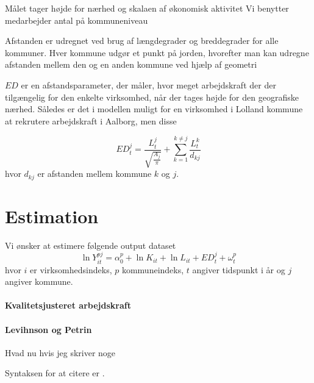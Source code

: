 \documentclass[a4paper, 12pt]{article}
\begin{document}
Målet tager højde for nærhed og skalaen af økonomisk aktivitet 
Vi benytter medarbejder antal på kommuneniveau

Afstanden er udregnet ved brug af længdegrader og breddegrader for alle kommuner. Hver kommune udgør et punkt på jorden, hvorefter man kan udregne afstanden mellem den og en anden kommune ved hjælp af geometri  

$ED$ er en afstandsparameter, der måler, hvor meget arbejdskraft der der tilgængelig for den enkelte virksomhed, når der tages højde for den geografiske nærhed. Således er det i modellen muligt for en virksomhed i Lolland kommune at rekrutere arbejdskraft i Aalborg, men disse 

\begin{equation}
   ED^j_t = \frac{L^j_t}{\sqrt{\frac{A_j}{\pi}}} + \sum_{k=1}^{k \neq j} \frac{L^k_t}{d_{kj}}
 \end{equation} 
 hvor $d_{kj}$ er afstanden mellem kommune $k$ og $j$. 
 

\section{Estimation}
Vi ønsker at estimere følgende output dataset
\begin{equation}
	\ln Y_{it}^{pj} = \alpha^p_0 + \ln K_{it} + \ln L_{it} + ED^j_{t} + \omega^p_{t}
\end{equation}
hvor $i$ er virksomhedsindeks, $p$ kommuneindeks, $t$ angiver tidspunkt i år og $j$ angiver kommune. 




\paragraph{Kvalitetsjusteret arbejdskraft}



\paragraph{Levihnson og Petrin}
Hvad nu hvis jeg skriver noge

Syntaksen for at citere er \cite[pp. 211ff.]{melo2009meta}. 






\end{document}
